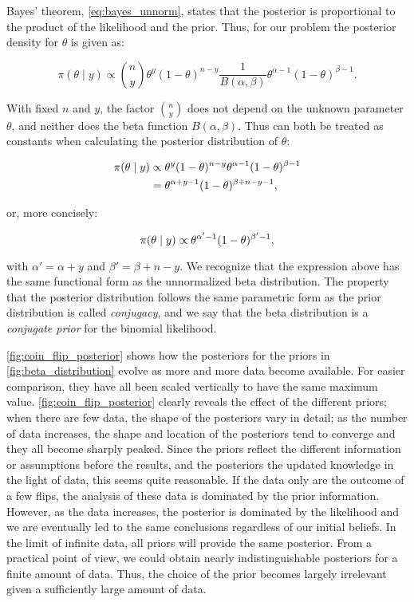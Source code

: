 Bayes' theorem, \autoref{eq:bayes_unnorm}, states that the posterior is proportional to the product of the likelihood and the prior. Thus, for our problem the posterior density for $\theta$ is given as: 

\begin{equation*}
    \pi (\theta \mid y) \propto \binom{n}{y} \theta^y (1-\theta)^{n-y} \frac{1}{B(\alpha, \beta)} \theta^{\alpha-1}(1-\theta)^{\beta -1}.
\end{equation*}

With fixed $n$ and $y$, the factor $\binom{n}{y}$ does not depend on the unknown parameter $\theta$, and neither does the beta function $B(\alpha, \beta)$. Thus can both be treated as constants when calculating the posterior distribution of $\theta$:

\begin{align*}
    \pi \qty(\theta \mid y) &\propto \theta^y (1-\theta)^{n-y} \theta^{\alpha-1}(1-\theta)^{\beta -1} \\
    &= \theta^{\alpha + y -1} (1-\theta)^{\beta + n-y -1},
\end{align*}

or, more concisely:

\begin{equation}\label{eq:coin_posterior}
    \pi \qty(\theta \mid y) \propto \theta^{\alpha' -1} (1-\theta)^{\beta' -1},
\end{equation}

with $\alpha'=\alpha+y$ and $\beta' = \beta + n - y$. We recognize that the expression above has the same functional form as the unnormalized beta distribution. The property that the posterior distribution follows the same parametric form as the prior distribution is called \textit{conjugacy}, and we say that the beta distribution is a \textit{conjugate prior} for the binomial likelihood.  

\autoref{fig:coin_flip_posterior} shows how the posteriors for the priors in \autoref{fig:beta_distribution} evolve as more and more data become available. For easier comparison, they have all been scaled vertically to have the same maximum value. \autoref{fig:coin_flip_posterior} clearly reveals the effect of the different priors; when there are few data, the shape of the posteriors vary in detail; as the number of data increases, the shape and location of the posteriors tend to converge and they all become sharply peaked. Since the priors reflect the different information or assumptions before the results, and the posteriors the updated knowledge in the light of data, this seems quite reasonable. If the data only are the outcome of a few flips, the analysis of these data is dominated by the prior information. However, as the data increases, the posterior is dominated by the likelihood and we are eventually led to the same conclusions regardless of our initial beliefs. In the limit of infinite data, all priors will provide the same posterior. From a practical point of view, we could obtain nearly indistinguishable posteriors for a finite amount of data. Thus, the choice of the prior becomes largely irrelevant given a sufficiently large amount of data.

